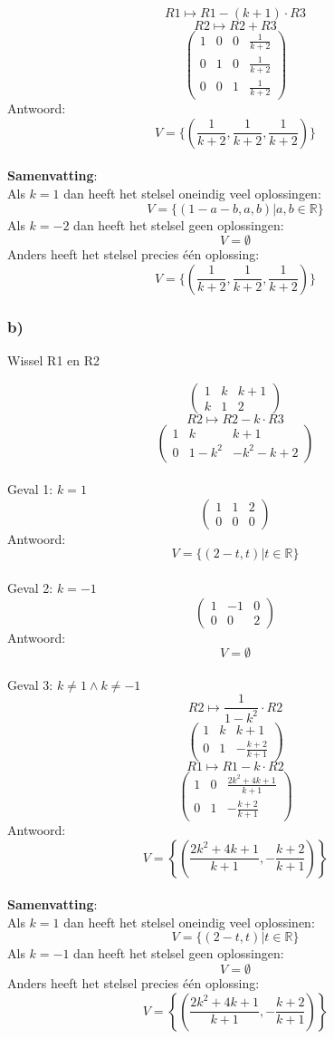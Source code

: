 \documentclass[10pt,a4paper]{article}
\begin{document}
\[ R1 \longmapsto R1 - (k+1)\cdot R3\]
\[ R2 \longmapsto R2 + R3\]
\[
\begin{pmatrix}
1 &  0 &  0 & \frac{1}{k+2}\\
0 &  1 &  0 & \frac{1}{k+2}\\
0 &  0 &  1 & \frac{1}{k+2}
\end{pmatrix}
\]
Antwoord:
\[
V=\{(\frac{1}{k+2},\frac{1}{k+2},\frac{1}{k+2})\}
\]\\
\textbf{Samenvatting}:\\
Als $k=1$ dan heeft het stelsel oneindig veel oplossingen:
\[
V=\{ (1-a-b,a,b) | a,b \in \mathbb{R}\}
\]
Als $k=-2$ dan heeft het stelsel geen oplossingen:
\[
V=\emptyset
\]
Anders heeft het stelsel precies één oplossing:
\[
V=\{(\frac{1}{k+2},\frac{1}{k+2},\frac{1}{k+2})\}
\]

\subsubsection*{b)}
\begin{center}
Wissel R1 en R2
\end{center}
\[
\begin{pmatrix}
1 &  k &  k+1\\
k &  1 &  2
\end{pmatrix}
\]
\[ R2 \longmapsto R2 - k\cdot R3\]
\[
\begin{pmatrix}
1 &  k &  k+1\\
0 &  1-k^2 &  -k^2-k+2
\end{pmatrix}
\]\\
Geval 1: $k=1$\\
\[
\begin{pmatrix}
1 &  1 &  2\\
0 &  0 &  0
\end{pmatrix}
\]
Antwoord:
\[
V=\{(2-t,t) | t \in \mathbb{R}\}
\]\\
Geval 2: $k=-1$\\
\[
\begin{pmatrix}
1 & -1 &  0\\
0 &  0 &  2
\end{pmatrix}
\]
Antwoord:
\[
V=\emptyset
\]\\
Geval 3: $k\neq 1 \wedge k\neq -1$\\
\[ R2 \longmapsto \frac{1}{1-k^2}\cdot R2 \]
\[
\begin{pmatrix}
1 &  k &  k+1\\
0 &  1 &  -\frac{k+2}{k+1}
\end{pmatrix}
\]
\[ R1 \longmapsto R1-k\cdot R2 \]
\[
\begin{pmatrix}
1 &  0 &  \frac{2k^2+4k+1}{k+1}\\
0 &  1 &  -\frac{k+2}{k+1}
\end{pmatrix}
\]
Antwoord:
\[
V=\left\lbrace\left(\frac{2k^2+4k+1}{k+1},-\frac{k+2}{k+1}\right)\right\rbrace
\]\\
\textbf{Samenvatting}:\\
Als $k=1$ dan heeft het stelsel oneindig veel oplossinen:
\[
V=\{(2-t,t) | t \in \mathbb{R}\}
\]
Als $k=-1$ dan heeft het stelsel geen oplossingen:
\[
V=\emptyset
\]
Anders heeft het stelsel precies één oplossing:
\[
V=\left\lbrace\left(\frac{2k^2+4k+1}{k+1},-\frac{k+2}{k+1}\right)\right\rbrace
\]
\end{document}
